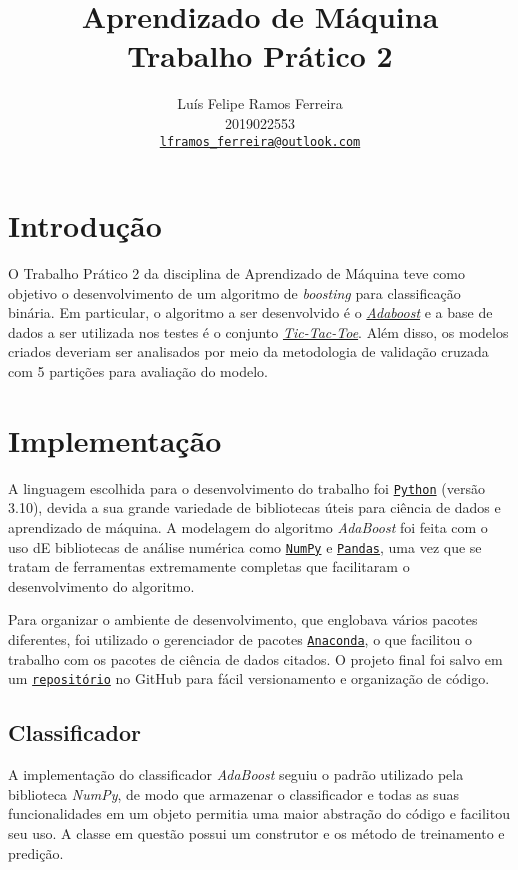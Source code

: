 \documentclass{article}
\title{Aprendizado de Máquina \\ Trabalho Prático 2}
\author{Luís Felipe Ramos Ferreira \\ 2019022553 \\
    \href{mailto:lframos_ferreira@outlook.com}{\texttt{lframos\_ferreira@outlook.com}}}
\begin{document}
\maketitle

\section{Introdução}

O Trabalho Prático 2 da disciplina de Aprendizado de Máquina teve como objetivo o desenvolvimento de um algoritmo de \textit{boosting}
para classificação binária. Em particular, o algoritmo a ser desenvolvido é o \href{https://en.wikipedia.org/wiki/AdaBoost}{\textit{Adaboost}} e a base de dados a ser
utilizada nos testes é o conjunto \href{https://archive.ics.uci.edu/ml/datasets/Tic-Tac-Toe+Endgame}{\textit{Tic-Tac-Toe}}. Além disso, os modelos criados deveriam
ser analisados por meio da metodologia de validação cruzada com 5 partições para avaliação do modelo.

\section{Implementação}

A linguagem escolhida para o desenvolvimento do trabalho foi \href{https://www.python.org/}{\texttt{Python}} (versão 3.10), devida a sua grande variedade de bibliotecas úteis para ciência de dados e aprendizado de máquina.
 A modelagem do algoritmo \textit{AdaBoost} foi feita com o uso dE bibliotecas de análise numérica como \href{https://numpy.org/}{\texttt{NumPy}} e \href{https://pandas.pydata.org/}{\texttt{Pandas}}, 
 uma vez que se tratam de ferramentas extremamente completas que facilitaram o desenvolvimento do algoritmo.

Para organizar o ambiente de desenvolvimento, que englobava vários pacotes diferentes, foi utilizado o gerenciador de pacotes \href{https://www.anaconda.com/}{\texttt{Anaconda}}, o que facilitou o trabalho
com os pacotes de ciência de dados citados. O projeto final foi salvo em um \href{https://github.com/lframosferreira/boosting-process}{\texttt{repositório}} no GitHub para fácil versionamento e organização de código.

\subsection{Classificador}

A implementação do classificador \textit{AdaBoost} seguiu o padrão utilizado pela biblioteca \textit{NumPy}, de modo que armazenar o classificador e todas as suas funcionalidades em um objeto permitia uma maior abstração do código e 
facilitou seu uso. A classe em questão possui um construtor e os método de treinamento e predição.
\end{document}
